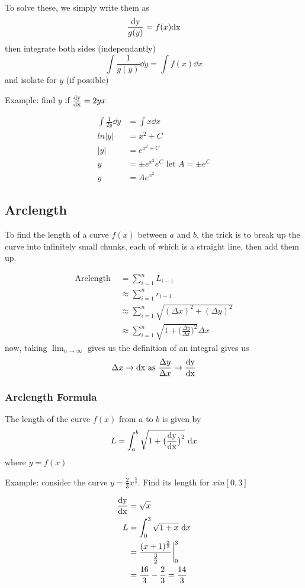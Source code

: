 \documentclass[12pt]{article}
\newcommand{\inint}[2]{\int #1 \dd #2}
\begin{document}
To solve these, we simply write them as \[ \frac{{\rm dy}}{g(y)} = f(x){\rm dx} \] then integrate both sides (independantly) \[ \inint{\frac{1}{g(y)}}{y} = \inint{f(x)}{x} \] and isolate for $y$ (if possible)

Example: find $y$ if $\frac{{\rm dy}}{{\rm dx}} = 2yx$

\begin{align*}
\inint{\frac{1}{2y}}{y} &= \inint{x}{x}\\
ln|y| &= x^2 + C\\
|y| &= e^{x^2 + C}\\
y &= \pm e^{x^2}e^C \text{ let $A = \pm e^C$}\\
y &= Ae^{x^2}
\end{align*}

\subsection*{Arclength}
To find the length of a curve $f(x)$ between $a$ and $b$, the trick is to break up the curve into infinitely small chunks, each of which is a straight line, then add them up.

\begin{align*}
\text{Arclength } &= \sum_{i=1}^n L_{i-1}\\
&\approx \sum_{i=1}^n r_{i-1}\\
&\approx \sum_{i=1}^n \sqrt{(\Delta x)^2 + (\Delta y)^2}\\
&\approx \sum_{i=1}^n \sqrt{1+\bigl(\frac{\Delta y}{\Delta x}\bigl)^2} \Delta x
\end{align*}
now, taking $\displaystyle\lim_{n\to\infty}$ gives us the definition of an integral gives us \[ \Delta x \to {\rm dx\ as\ } \frac{\Delta y}{\Delta x} \to \frac{{\rm dy}}{{\rm dx}} \]

\subsubsection*{Arclength Formula}
The length of the curve $f(x)$ from $a$ to $b$ is given by \[ L = \int_a^b \sqrt{1+\bigl(\frac{{\rm dy}}{{\rm dx}}\bigl)^2} \ {\rm d} x \] where $y = f(x)$

Example: consider the curve $y = \frac{2}{3}x^{\frac{3}{2}}$. Find its length for $xin [0,3]$

\begin{align*}
\frac{{\rm dy}}{{\rm dx}} &= \sqrt{x}\\
L &= \int_0^3 \sqrt{1+x} \ {\rm d} x\\
&= \frac{(x+1)^{\frac{3}{2}}}{\frac{3}{2}} \bigg|_0^3\\
&= \frac{16}{3} - \frac{2}{3} = \frac{14}{3}
\end{align*}
\end{document}
